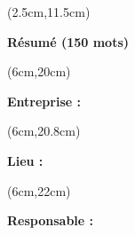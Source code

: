 \begin{titlepage}
    \begin{textblock*}{16cm}(2.5cm,11.5cm)
        \makeatletter
        \noindent
        \normalsize
        \selectfont
        \begin{center}
            \textbf{\textcolor{bleuRoiUTT}{Résumé (150 mots)}}
        \end{center}
        \begin{flushleft}
            \justifying
            \titletext
        \end{flushleft}
        \makeatother
    \end{textblock*}


    \begin{textblock*}{16cm}(6cm,20cm)
        \normalsize
        \begin{flushleft}
            \textbf{\textcolor{bleuRoiUTT}{Entreprise :} \theEntreprise}
        \end{flushleft}
    \end{textblock*}

    \begin{textblock*}{16cm}(6cm,20.8cm)
        \normalsize
        \begin{flushleft}
            \textbf{\textcolor{bleuRoiUTT}{Lieu :} \textit{\mapAddr{\theLieu}}}
        \end{flushleft}
    \end{textblock*}

    \begin{textblock*}{16cm}(6cm,22cm)
        \normalsize
        \begin{flushleft}
            \textbf{\textcolor{bleuRoiUTT}{Responsable :} \theREntre}
        \end{flushleft}
    \end{textblock*}

\end{titlepage}

\clearpage %
